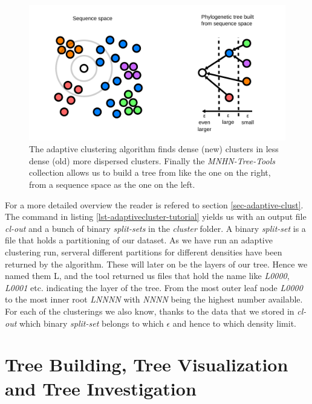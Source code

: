 \begin{figure}
  \includegraphics{densities-space.pdf}
  \caption{The adaptive clustering algorithm finds dense (new)
    clusters in less dense (old) more dispersed clusters. Finally the
    \emph{MNHN-Tree-Tools} collection allows us to build a tree from like
    the one on the right, from a sequence space as the one on the
    left.}
  \label{fig-adaptive-cluster}
\end{figure}
For a more detailed overview the reader is refered to section
\ref{sec-adaptive-clust}. 
The command in listing \ref{lst-adaptivecluster-tutorial} yields us
with an output file \emph{cl-out} and a bunch of binary
\emph{split-sets} in the
\emph{cluster} folder. A binary \emph{split-set} is a file that holds
a partitioning of our dataset. As we have run an adaptive clustering
run, serveral different partitions for different densities have been
returned by the algorithm. These will later on be the layers of our
tree. Hence we named them L, and the tool returned us files that hold
the name like \emph{L0000}, \emph{L0001} etc. indicating the layer of
the tree. From the most outer leaf node \emph{L0000} to the most inner
root \emph{LNNNN} with \emph{NNNN} being the highest number
available. For each of the clusterings we also know, thanks to the
data that we stored in \emph{cl-out} which binary \emph{split-set}
belongs to which $\epsilon$ and hence to which density limit.

\section{Tree Building, Tree Visualization and Tree Investigation}

